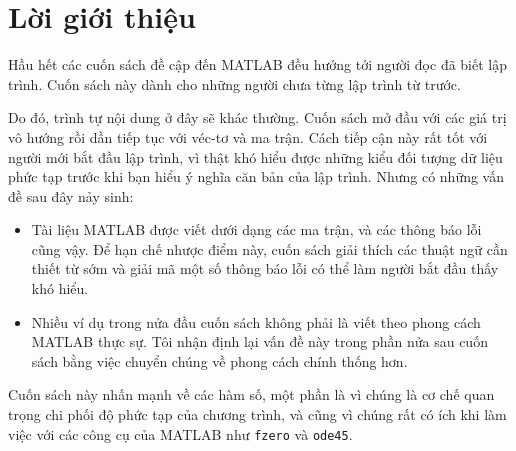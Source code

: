 \documentclass[12pt]{book}
\begin{document}





\chapter{Lời giới thiệu}

Hầu hết các cuốn sách đề cập đến MATLAB đều hướng tới người đọc 
đã biết lập trình. Cuốn sách này dành cho những người chưa từng 
lập trình từ trước.

Do đó, trình tự nội dung ở đây sẽ khác thường. Cuốn sách mở đầu với
các giá trị vô hướng rồi dần tiếp tục với véc-tơ và ma trận. Cách tiếp
cận này rất tốt với người mới bắt đầu lập trình, vì thật khó hiểu được
những kiểu đối tượng dữ liệu phức tạp trước khi bạn hiểu ý nghĩa
căn bản của lập trình. Nhưng có những vấn đề sau đây nảy sinh:

\begin{itemize}

\item Tài liệu MATLAB được viết dưới dạng các ma trận, và các
thông báo lỗi cũng vậy. Để hạn chế nhược điểm này, cuốn sách
giải thích các thuật ngữ cần thiết từ sớm và giải mã một số 
thông báo lỗi có thể làm người bắt đầu thấy khó hiểu.

\item Nhiều ví dụ trong nửa đầu cuốn sách không phải là viết theo
phong cách MATLAB thực sự. Tôi nhận định lại vấn đề này trong phần
nửa sau cuốn sách bằng việc chuyển chúng về phong cách chính thống
hơn.

\end{itemize}

Cuốn sách này nhấn mạnh về các hàm số, một phần là vì chúng là 
cơ chế quan trọng chi phối độ phức tạp của chương trình, và cũng 
vì chúng rất có ích khi làm việc với các công cụ của MATLAB như 
{\tt fzero} và {\tt ode45}.
\end{document}

